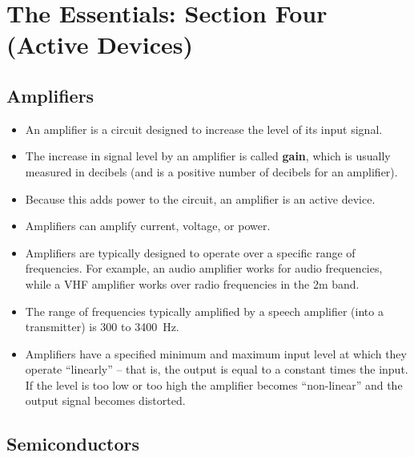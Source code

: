 \documentclass[letterpaper,12pt]{scrartcl}
\begin{document}
\section{The Essentials: Section Four (Active Devices)}

\subsection{Amplifiers}

\begin{itemize}
\item An amplifier is a circuit designed to increase the level of its input signal.
\item The increase in signal level by an amplifier is called \textbf{gain}, which is usually measured in decibels
(and is a positive number of decibels for an amplifier).
\item Because this adds power to the circuit, an amplifier is an active device.
\item Amplifiers can amplify current, voltage, or power.
\item Amplifiers are typically designed to operate over a specific range of frequencies. For example, an audio amplifier works for audio frequencies,
while a VHF amplifier works over radio frequencies in the 2m band.
\item The range of frequencies typically amplified by a speech amplifier (into a transmitter) is 300 to 3400~Hz.
\item Amplifiers have a specified minimum and maximum input level at which they operate ``linearly'' -- that is,
the output is equal to a constant times the input. If the level is too low or too high the amplifier becomes ``non-linear''
and the output signal becomes distorted.
\end{itemize}

\subsection{Semiconductors}
\end{document}
